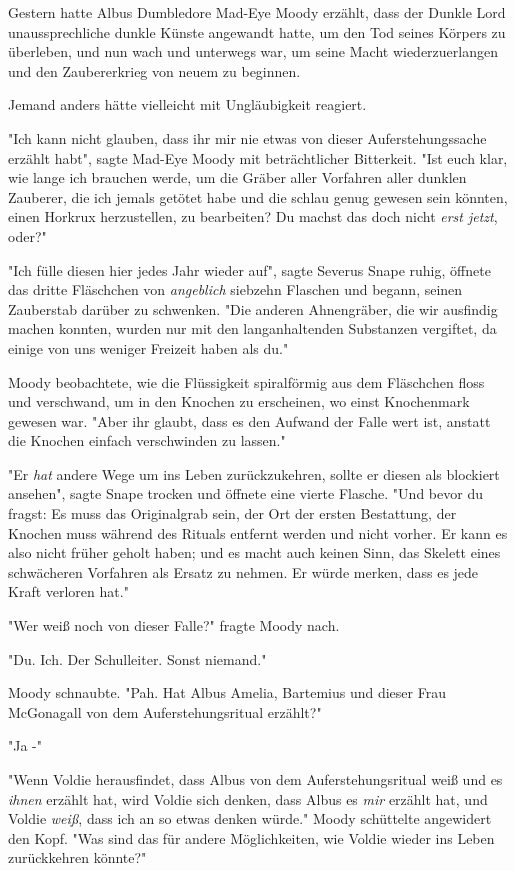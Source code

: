 {Gestern hatte Albus Dumbledore Mad-Eye Moody erzählt, dass der Dunkle Lord unaussprechliche dunkle Künste angewandt hatte, um den Tod seines Körpers zu überleben, und nun wach und unterwegs war, um seine Macht wiederzuerlangen und den Zaubererkrieg von neuem zu beginnen.

Jemand anders hätte vielleicht mit Ungläubigkeit reagiert.

"Ich kann nicht glauben, dass ihr mir nie etwas von dieser Auferstehungssache erzählt habt", sagte Mad-Eye Moody mit beträchtlicher Bitterkeit. "Ist euch klar, wie lange ich brauchen werde, um die Gräber aller Vorfahren aller dunklen Zauberer, die ich jemals getötet habe und die schlau genug gewesen sein könnten, einen Horkrux herzustellen, zu bearbeiten? Du machst das doch nicht \emph{erst jetzt}, oder?"

"Ich fülle diesen hier jedes Jahr wieder auf", sagte Severus Snape ruhig, öffnete das dritte Fläschchen von \emph{angeblich} siebzehn Flaschen und begann, seinen Zauberstab darüber zu schwenken. "Die anderen Ahnengräber, die wir ausfindig machen konnten, wurden nur mit den langanhaltenden Substanzen vergiftet, da einige von uns weniger Freizeit haben als du."

Moody beobachtete, wie die Flüssigkeit spiralförmig aus dem Fläschchen floss und verschwand, um in den Knochen zu erscheinen, wo einst Knochenmark gewesen war. "Aber ihr glaubt, dass es den Aufwand der Falle wert ist, anstatt die Knochen einfach verschwinden zu lassen."

"Er \emph{hat} andere Wege um ins Leben zurückzukehren, sollte er diesen als blockiert ansehen", sagte Snape trocken und öffnete eine vierte Flasche. "Und bevor du fragst: Es muss das Originalgrab sein, der Ort der ersten Bestattung, der Knochen muss während des Rituals entfernt werden und nicht vorher. Er kann es also nicht früher geholt haben; und es macht auch keinen Sinn, das Skelett eines schwächeren Vorfahren als Ersatz zu nehmen. Er würde merken, dass es jede Kraft verloren hat."

"Wer weiß noch von dieser Falle?" fragte Moody nach.

"Du. Ich. Der Schulleiter. Sonst niemand."

Moody schnaubte. "Pah. Hat Albus Amelia, Bartemius und dieser Frau McGonagall von dem Auferstehungsritual erzählt?"

"Ja -"

"Wenn Voldie herausfindet, dass Albus von dem Auferstehungsritual weiß und es \emph{ihnen} erzählt hat, wird Voldie sich denken, dass Albus es \emph{mir} erzählt hat, und Voldie \emph{weiß}, dass ich an so etwas denken würde." Moody schüttelte angewidert den Kopf. "Was sind das für andere Möglichkeiten, wie Voldie wieder ins Leben zurückkehren könnte?"

}
